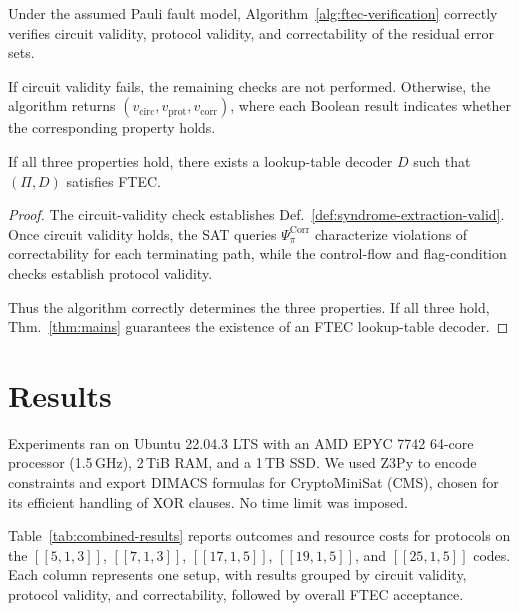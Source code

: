 \documentclass[acmsmall,screen,review,anonymous,nonacm]{acmart}
\begin{document}
\begin{theorem}
\label{thm:verification-correctness}
Under the assumed Pauli fault model,
Algorithm~\ref{alg:ftec-verification} correctly verifies
circuit validity, protocol validity, and correctability
of the residual error sets.

If circuit validity fails, the remaining checks are
not performed. Otherwise, the algorithm returns
$(v_{\mathrm{circ}},v_{\mathrm{prot}},v_{\mathrm{corr}})$,
where each Boolean result indicates whether the
corresponding property holds.

If all three properties hold, there exists a
lookup-table decoder $D$ such that $(\Pi,D)$
satisfies FTEC.
\end{theorem}

\begin{proof}
The circuit-validity check establishes
Def.~\ref{def:syndrome-extraction-valid}.
Once circuit validity holds, the SAT queries
$\Psi^{\mathrm{Corr}}_\pi$ characterize violations
of correctability for each terminating path,
while the control-flow and flag-condition checks
establish protocol validity.

Thus the algorithm correctly determines the
three properties. If all three hold,
Thm.~\ref{thm:mains} guarantees the existence
of an FTEC lookup-table decoder.
\end{proof}


\section{Results}
Experiments ran on Ubuntu 22.04.3 LTS with an AMD EPYC 7742 64-core processor (1.5\,GHz), 2\,TiB RAM, and a 1\,TB SSD. We used Z3Py to encode constraints and export DIMACS formulas for CryptoMiniSat (CMS), chosen for its efficient handling of XOR clauses. No time limit was imposed.

Table~\ref{tab:combined-results} reports outcomes and resource costs for protocols on the $[[5,1,3]]$, $[[7,1,3]]$, $[[17,1,5]]$, $[[19,1,5]]$, and $[[25,1,5]]$ codes. Each column represents one setup, with results grouped by circuit validity, protocol validity, and correctability, followed by overall FTEC acceptance.

\end{document}
